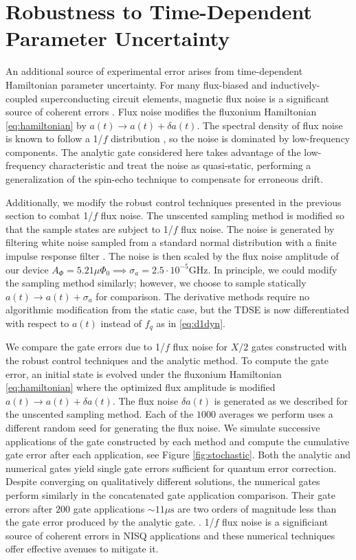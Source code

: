\section{Robustness to Time-Dependent Parameter Uncertainty \label{sec:stochastic}}
An additional source of experimental error arises from time-dependent
Hamiltonian parameter uncertainty. For many flux-biased and inductively-coupled
superconducting circuit elements, magnetic flux noise is a significant
source of coherent errors . Flux noise
modifies the fluxonium Hamiltonian \eqref{eq:hamiltonian}
by $a(t) \rightarrow a(t) + \delta a(t)$.
The spectral density of flux noise is known to
follow a 1/$f$ distribution
\cite{bialczak20071f, koch2007model,
  yoshihara2006decoherence, yoshihara2010correlated},
so the noise is dominated by low-frequency components.
The analytic gate considered here
takes advantage of the low-frequency characteristic and
treat the noise as quasi-static, performing a generalization of the spin-echo
technique to compensate for erroneous drift.

Additionally, we modify the robust control techniques presented
in the previous section to combat 1/$f$ flux noise.
The unscented sampling method is modified so that the sample states
are subject to 1/$f$ flux noise. The noise
is generated by filtering white noise sampled from a standard
normal distribution with a finite impulse response filter \cite{saspweb2011}.
The noise is then scaled by the 
flux noise amplitude of our device $A_{\Phi} = 5.21 \mu \Phi_{0} \implies
\sigma_{a} = 2.5 \cdot 10^{-5} \textrm{GHz}$.
In principle, we could modify the sampling method
similarly; however, we choose to sample statically $a(t) \rightarrow a(t) + \sigma_{a}$
for comparison. The derivative methods require no algorithmic modification
from the static case, but the TDSE is now differentiated with respect
to $a(t)$ instead of $f_{q}$ as in \eqref{eq:d1dyn}.

We compare the gate errors due to 1/$f$ flux noise for $X/2$
gates constructed with the robust control techniques
and the analytic method. To compute the gate error,
an initial state is evolved
under the fluxonium Hamiltonian \eqref{eq:hamiltonian}
where the optimized flux amplitude is modified $a(t) \rightarrow a(t) + \delta a(t)$.
The flux noise $\delta a(t)$ is generated as
we described for the unscented sampling method.
Each of the $1000$ averages we perform uses a different random seed for
generating the flux noise.
We simulate successive applications of the gate constructed by each method
and compute the cumulative gate error
after each application, see Figure \ref{fig:stochastic}.
Both the analytic
and numerical gates yield single gate errors
sufficient for quantum error correction.
Despite converging on qualitatively different solutions, the
numerical gates perform similarly in the concatenated
gate application comparison. Their gate errors
after $200$ gate applications $\sim 11 \mu\textrm{s}$ are
two orders of magnitude less than the gate error produced by the analytic gate.
.
1/$f$ flux noise is a significiant source of coherent errors in NISQ applications and
these numerical techniques offer effective avenues to mitigate it.
